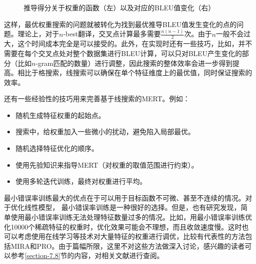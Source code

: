 \begin{figure}[htp]
\centering

\caption{推导得分关于权重的函数（左）以及对应的BLEU值变化（右）}
\label{fig:7-25}
\end{figure}

\parinterval 这样，最优权重搜索的问题就被转化为找到最优推导BLEU值发生变化的点的问题。理论上，对于$n$-best翻译，交叉点计算最多需要$\frac{n(n-1)}{2}$次。由于$n$一般不会过大，这个时间成本完全是可以接受的。此外，在实现时还有一些技巧，比如，并不需要在每个交叉点处对整个数据集进行BLEU计算，可以只对BLEU产生变化的部分（比如$n$-gram匹配的数量）进行调整，因此搜索的整体效率会进一步得到提高。相比于格搜索，线搜索可以确保在单个特征维度上的最优值，同时保证搜索的效率。

\parinterval 还有一些经验性的技巧用来完善基于线搜索的MERT。例如：

\begin{itemize}
\vspace{0.5em}
\item 随机生成特征权重的起始点。
\vspace{0.5em}
\item 搜索中，给权重加入一些微小的扰动，避免陷入局部最优。
\vspace{0.5em}
\item 随机选择特征优化的顺序。
\vspace{0.5em}
\item 使用先验知识来指导MERT（对权重的取值范围进行约束）。
\vspace{0.5em}
\item 使用多轮迭代训练，最终对权重进行平均。
\vspace{0.5em}
\end{itemize}

\parinterval 最小错误率训练最大的优点在于可以用于目标函数不可微、甚至不连续的情况。对于优化线性模型， 最小错误率训练是一种很好的选择。但是，也有研究发现，简单使用最小错误率训练无法处理特征数量过多的情况。比如，用最小错误率训练优化10000个稀疏特征的权重时，优化效果可能会不理想，而且收敛速度慢。这时也可以考虑使用在线学习等技术对大量特征的权重进行调优，比较有代表性的方法包括MIRA和PRO。由于篇幅所限，这里不对这些方法做深入讨论，感兴趣的读者可以参考\ref{section-7.8}节的内容，对相关文献进行查阅。


